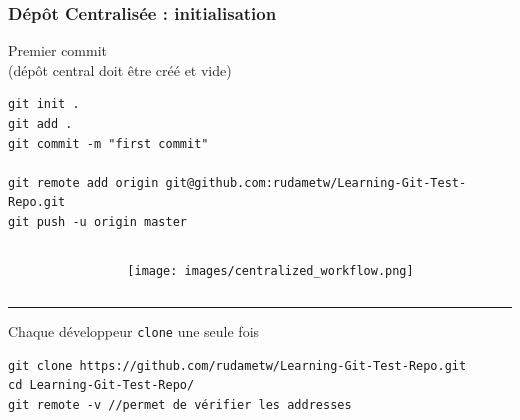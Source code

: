 \documentclass[table,tikz,12pt,svgnames]{beamer}
\begin{document}
\begin{frame}[fragile]
\frametitle{Dépôt Centralisée : initialisation}
\begin{adjustwidth}{-2em}{0cm}{}
\color{darkgreen}%
\noindent
Premier commit \\ \small(dépôt central doit être créé et vide)
\color{black}
\end{adjustwidth}
\begin{adjustwidth}{-1em}{0cm}{}
\begin{verbatim}
git init .
git add .
git commit -m "first commit"

git remote add origin git@github.com:rudametw/Learning-Git-Test-Repo.git
git push -u origin master
\end{verbatim}
\end{adjustwidth}

\begin{adjustwidth}{-0cm}{0cm}{}
	\begin{columns}[T] %
		\begin{column}{.6\textwidth}
		\end{column}%
		\begin{column}{.3\textwidth}
			\color{black}
			\vspace{-11em}
			\begin{adjustwidth}{-0cm}{-3cm}{}
				\begin{figure}
					\hfill
					\texttt{[image: images/centralized\_workflow.png]}
				\end{figure}
			\end{adjustwidth}
		\end{column}%
	\end{columns}
	\vspace{-1em}
	\PAUSE
	\color{darkgray}\rule{\linewidth}{2pt}
	
	\begin{adjustwidth}{-0.5cm}{-3cm}{}
		\color{darkgreen}%
		Chaque développeur \texttt{clone} une seule fois
		\color{black}
		\begin{verbatim}
git clone https://github.com/rudametw/Learning-Git-Test-Repo.git
cd Learning-Git-Test-Repo/
git remote -v //permet de vérifier les addresses
		\end{verbatim}
		\end{adjustwidth}
	\end{adjustwidth}
\end{frame}
\end{document}
